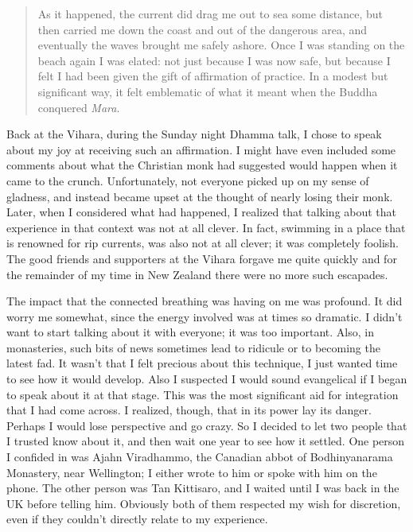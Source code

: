 \begin{quotation}
As it happened, the current did drag me out to sea some distance, but
then carried me down the coast and out of the dangerous area, and
eventually the waves brought me safely ashore. Once I was standing on
the beach again I was elated: not just because I was now safe, but
because I felt I had been given the gift of affirmation of practice. In
a modest but significant way, it felt emblematic of what it meant when
the Buddha conquered \emph{Mara}.
\end{quotation}

Back at the Vihara, during the Sunday night Dhamma talk, I chose to
speak about my joy at receiving such an affirmation. I might have even
included some comments about what the Christian monk had suggested would
happen when it came to the crunch. Unfortunately, not everyone picked up
on my sense of gladness, and instead became upset at the thought of
nearly losing their monk. Later, when I considered what had happened, I
realized that talking about that experience in that context was not at
all clever. In fact, swimming in a place that is renowned for rip
currents, was also not at all clever; it was completely foolish. The
good friends and supporters at the Vihara forgave me quite quickly and
for the remainder of my time in New Zealand there were no more such
escapades.

The impact that the connected breathing was having on me was profound.
It did worry me somewhat, since the energy involved was at times so
dramatic. I didn't want to start talking about it with everyone; it was
too important. Also, in monasteries, such bits of news sometimes lead to
ridicule or to becoming the latest fad. It wasn't that I felt precious
about this technique, I just wanted time to see how it would develop.
Also I suspected I would sound evangelical if I began to speak about it
at that stage. This was the most significant aid for integration that I
had come across. I realized, though, that in its power lay its danger.
Perhaps I would lose perspective and go crazy. So I decided to let two
people that I trusted know about it, and then wait one year to see how
it settled. One person I confided in was Ajahn Viradhammo, the Canadian
abbot of Bodhinyanarama Monastery, near Wellington; I either wrote to
him or spoke with him on the phone. The other person was Tan Kittisaro,
and I waited until I was back in the UK before telling him. Obviously both of them
respected my wish for discretion, even if they couldn't directly relate
to my experience.

